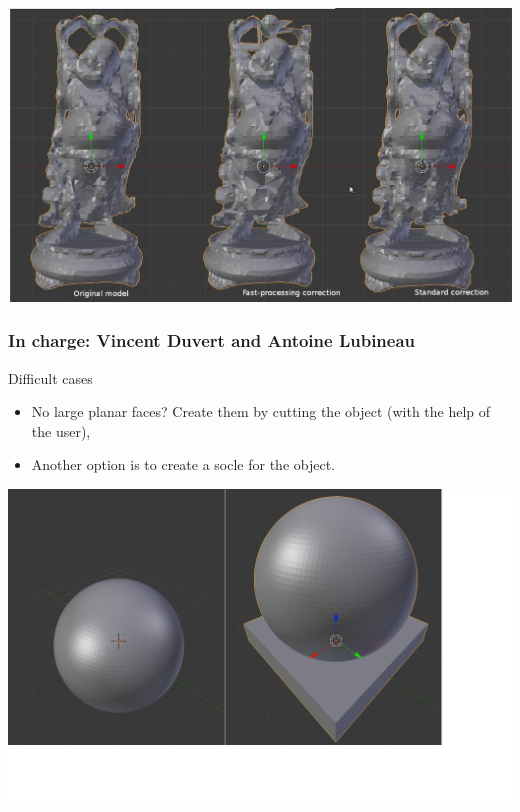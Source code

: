 \documentclass{beamer}
\begin{document}
\begin{frame}

    \includegraphics[width=1\textwidth]{damages}

\end{frame}

\begin{frame}
	\frametitle{In charge: Vincent Duvert and Antoine Lubineau} 
	\begin{block}{Difficult cases}
		\begin{itemize}
			\item No large planar faces? Create them by cutting the object (with the help of the user),
			\item Another option is to create a socle for the object.
		\end{itemize}
    \end{block}

	\begin{center}
		\includegraphics[width=.7\textwidth]{pf_socle}
	\end{center}
    
\end{frame}
\end{document}
